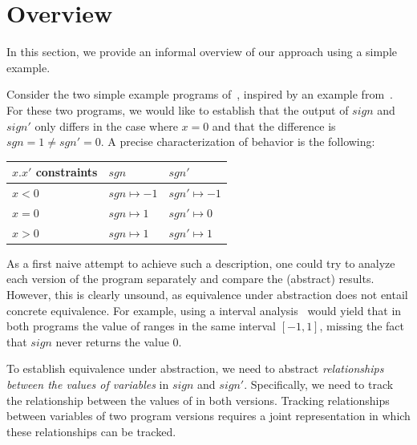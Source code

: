 \section{Overview}

In this section, we provide an informal overview of our approach using a simple example.



Consider the two simple example programs of~, inspired by an example from~\cite{MauborgneRival07}. For these two programs, we would like to establish that the output of $sign$ and $sign'$ only differs in the case where $x=0$ and that the difference is $sgn = 1 \neq sgn' = 0$. A precise characterization of behavior is the following:

\vspace{0.1in}
{\footnotesize
\begin{tabular}{l|l|l}
$x.x'$ constraints  & $sgn$             & $sgn'$
\\ \hline
$x < 0$             & $sgn \mapsto -1$  & $sgn' \mapsto -1$
\\ \hline
$x = 0$             & $sgn \mapsto 1$  & $sgn' \mapsto 0$
\\ \hline
$x > 0$             & $sgn \mapsto 1$  & $sgn' \mapsto 1$
\end{tabular}
}

As a first naive attempt to achieve such a description, one could try to analyze each version of the program separately and compare the (abstract) results. However, this is clearly unsound, as equivalence under abstraction does not entail concrete equivalence. For example, using a interval analysis~\cite{CousotHalbwachs78} would yield that in both programs the value of  ranges in the same interval $[-1,1]$, missing the fact that $sign$ never returns the value $0$.


To establish equivalence under abstraction, we need to abstract \emph{relationships between the values of variables} in $sign$ and $sign'$. Specifically, we need to track the relationship between the values of  in both versions. Tracking relationships between variables of two program versions requires a joint representation in which these relationships can be tracked.

